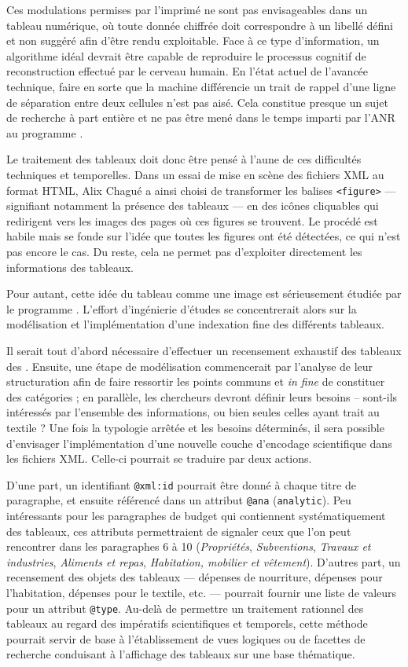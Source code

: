 Ces modulations permises par l'imprimé ne sont pas envisageables dans un tableau numérique, où toute donnée chiffrée doit correspondre à un libellé défini et non suggéré afin d'être rendu exploitable. Face à ce type d'information, un algorithme idéal devrait être capable de reproduire le processus cognitif de reconstruction effectué par le cerveau humain. En l'état actuel de l'avancée technique, faire en sorte que la machine différencie un trait de rappel d'une ligne de séparation entre deux cellules n'est pas aisé. Cela constitue presque un sujet de recherche à part entière et ne pas être mené dans le temps imparti par l'ANR au programme \timeus.

Le traitement des tableaux doit donc être pensé à l'aune de ces difficultés techniques et temporelles. Dans un essai de mise en scène des fichiers XML au format HTML, Alix Chagué a ainsi choisi de transformer les balises \texttt{<figure>} --- signifiant notamment la présence des tableaux --- en des icônes cliquables qui redirigent vers les images des pages où ces figures se trouvent. Le procédé est habile mais se fonde sur l'idée que toutes les figures ont été détectées, ce qui n'est pas encore le cas. Du reste, cela ne permet pas d'exploiter directement les informations des tableaux.

Pour autant, cette idée du tableau comme une image est sérieusement étudiée par le programme \timeus. L'effort d'ingénierie d'études se concentrerait alors sur la modélisation et l'implémentation d'une indexation fine des différents tableaux.

Il serait tout d'abord nécessaire d'effectuer un recensement exhaustif des tableaux des \odm. Ensuite, une étape de modélisation commencerait par l'analyse de leur structuration afin de faire ressortir les points communs et \textit{in fine} de constituer des catégories ; en parallèle, les chercheurs devront définir leurs besoins -- sont-ils intéressés par l'ensemble des informations, ou bien seules celles ayant trait au textile ? Une fois la typologie arrêtée et les besoins déterminés, il sera possible d'envisager l'implémentation d'une nouvelle couche d'encodage scientifique dans les fichiers XML. Celle-ci pourrait se traduire par deux actions.

D'une part, un identifiant \texttt{@xml:id} pourrait être donné à chaque titre de paragraphe, et ensuite référencé dans un attribut \texttt{@ana} (\texttt{analytic}). Peu intéressants pour les paragraphes de budget qui contiennent systématiquement des tableaux, ces attributs permettraient de signaler ceux que l'on peut rencontrer dans les paragraphes 6 à 10 (\textit{Propriétés}, \textit{Subventions}, \textit{Travaux et industries}, \textit{Aliments et repas}, \textit{Habitation, mobilier et vêtement}). D'autres part, un recensement des objets des tableaux --- dépenses de nourriture, dépenses pour l'habitation, dépenses pour le textile, etc. --- pourrait fournir une liste de valeurs pour un attribut \texttt{@type}. Au-delà de permettre un traitement rationnel des tableaux au regard des impératifs scientifiques et temporels, cette méthode pourrait servir de base à l'établissement de vues logiques ou de facettes de recherche conduisant à l'affichage des tableaux sur une base thématique.

